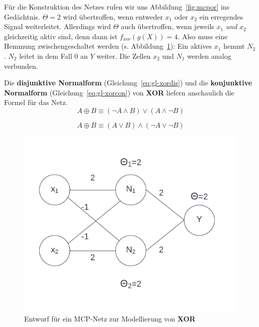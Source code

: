 {Für die Konstruktion des Netzes rufen wir uns Abbildung~\ref{fig:mcpor} ins Gedächtnis. $\Theta = 2$ wird übertroffen, wenn entweder $x_1$ oder $x_2$ ein erregendes Signal weiterleitet. Allerdings wird $\Theta$ auch übertroffen, wenn jeweils $x_1$ \textit{und} $x_2$ gleichzeitig aktiv sind, denn dann ist $f_{xor}(g(X)) = 4$.
Also muss eine Hemmung zwischengeschaltet werden (s. Abbildung~\ref{fig-mcpxorf}): Ein aktives $x_1$ hemmt $N_2$. $N_2$ leitet in dem Fall $0$ an $Y$ weiter. Die Zellen $x_2$ und $N_1$ werden analog verbunden.

Die \textbf{disjunktive Normalform} (Gleichung~\ref{eq:gl-xordis}) und die \textbf{konjunktive Normalform} (Gleichung~\ref{eq:gl-xorcon}) von \textbf{XOR} liefern anschaulich die Formel für das Netz.\\

\begin{equation}
A \oplus B \equiv (\neg A \land B) \lor (A \land \neg B)
\label{eq:gl-xordis}
\end{equation}

\begin{equation}
A \oplus B \equiv (A \lor B) \land (\neg A \lor \neg B)
\label{eq:gl-xorcon}
\end{equation}


\begin{figure}[h]
    \centering
    \includegraphics{chapters/3. Kuenstliche Neuronen/mcpxor}
    \caption{Entwurf für ein MCP-Netz zur Modellierung von \textbf{XOR}}
    \label{fig-mcpxorf}
\end{figure}


}
